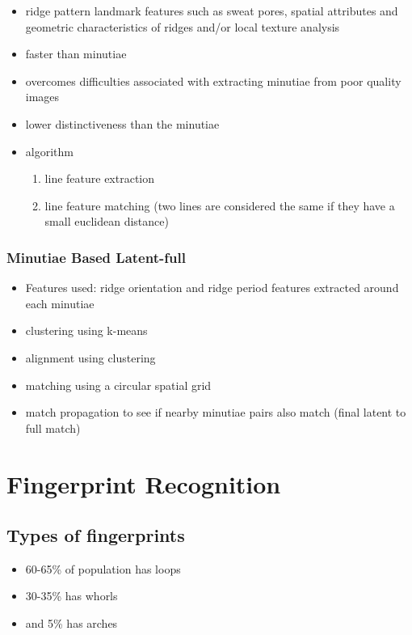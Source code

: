 \documentclass[paper=a4, fontsize=11pt]{scrartcl} %
\numberwithin{equation}{section} %
\numberwithin{figure}{section} %
\numberwithin{table}{section} %
\begin{document}
\begin{itemize}
\item ridge pattern landmark features such as sweat pores, spatial attributes and geometric characteristics of ridges and/or local texture analysis
\item faster than minutiae
\item overcomes difficulties associated with extracting minutiae from poor quality images
\item lower distinctiveness than the minutiae
\item algorithm
\begin{enumerate}
\item line feature extraction
\item line feature matching (two lines are considered the same if they have a small euclidean distance)
\end{enumerate}
\end{itemize}

\subsubsection{Minutiae Based Latent-full}

\begin{itemize}
\item Features used: ridge orientation and ridge period features extracted around each minutiae
\item clustering using k-means
\item alignment using clustering
\item matching using a circular spatial grid
\item match propagation to see if nearby minutiae pairs also match (final latent to full match)
\end{itemize}

\section{Fingerprint Recognition}

\subsection{Types of fingerprints}

\begin{itemize}
\item 60-65\% of population has loops
\item 30-35\% has whorls
\item and 5\% has arches
\end{itemize}
\end{document}
